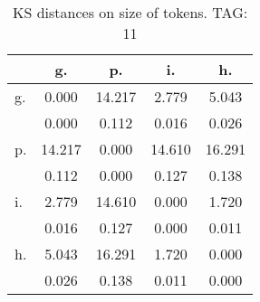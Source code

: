 \begin{table}[h!]
\begin{center}
\begin{tabular}{| l | c | c | c | c |}\hline
 & g. & p. & i. & h. \\\hline
g. & 0.000  & 14.217  & 2.779  & 5.043 \\\hline
 & 0.000  & 0.112  & 0.016  & 0.026 \\\hline
p. & 14.217  & 0.000  & 14.610  & 16.291 \\\hline
 & 0.112  & 0.000  & 0.127  & 0.138 \\\hline
i. & 2.779  & 14.610  & 0.000  & 1.720 \\\hline
 & 0.016  & 0.127  & 0.000  & 0.011 \\\hline
h. & 5.043  & 16.291  & 1.720  & 0.000 \\\hline
 & 0.026  & 0.138  & 0.011  & 0.000 \\\hline
\end{tabular}
\caption{KS distances on size of tokens. TAG: 11}
\end{center}
\end{table}